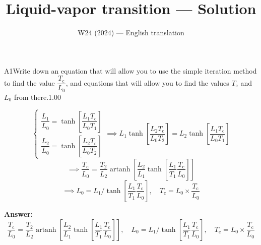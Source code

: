 \documentclass[11pt,a4paper]{article}
\title{\textbf{Liquid-vapor transition --- Solution}}
\author{\normalsize W24 (2024) — English translation}
\date{}
\begin{document}
\maketitle\vspace{-0.5em}

\begin{solcard}{A1}{Write down an equation that will allow you to use the simple iteration method to find the value $\dfrac{T_\mathrm c}{L_0}$, and equations that will allow you to find the values $T_\mathrm c$ and $L_0$ from there.}{1.00}

\[
\left\{\begin{array}{l}
\dfrac{L_1}{L_0}=\tanh\left[\dfrac{L_1T_\mathrm c}{L_0T_1}\right]\\
\dfrac{L_2}{L_0}=\tanh\left[\dfrac{L_2T_\mathrm c}{L_0T_2}\right]
\end{array}\right.
\implies L_1\tanh\left[\dfrac{L_2T_\mathrm c}{L_0T_2}\right]=L_2\tanh\left[\dfrac{L_1T_\mathrm c}{L_0T_1}\right]
\]
\[
\implies\frac{T_\mathrm c}{L_0}=\frac{T_2}{L_2}\operatorname{artanh}\left[\frac{L_2}{L_1}\tanh\left[\frac{L_1}{T_1}\frac{T_\mathrm c}{L_0}\right]\right]
\]
\[
\implies L_0=L_1\bigg/\tanh\left[\frac{L_1}{T_1}\frac{T_\mathrm c}{L_0}\right],\quad T_\mathrm c=L_0\times\frac{T_\mathrm c}{L_0}
\]

\par\smallskip\noindent\textbf{Answer:} 
\[\frac{T_\mathrm c}{L_0}=\frac{T_2}{L_2}\operatorname{artanh}\left[\frac{L_2}{L_1}\tanh\left[\frac{L_1}{T_1}\frac{T_\mathrm c}{L_0}\right]\right],\quad L_0=L_1\bigg/\tanh\left[\frac{L_1}{T_1}\frac{T_\mathrm c}{L_0}\right],\quad T_\mathrm c=L_0\times\frac{T_\mathrm c}{L_0}\]
\end{solcard}
\end{document}
